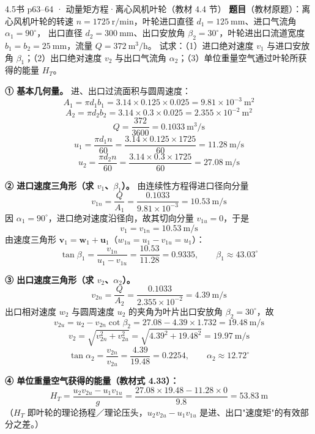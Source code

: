 \begin{liti}{4.5}{书 p63--64 · 动量矩方程·离心风机叶轮（教材 4.4 节）}
\textbf{题目}（教材原题）：离心风机叶轮的转速 $n=1725\ \mathrm{r/min}$，叶轮进口直径 $d_1=125\ \mathrm{mm}$、进口气流角 $\alpha_1=90^{\circ}$，
出口直径 $d_2=300\ \mathrm{mm}$、出口安放角 $\beta_2=30^{\circ}$，叶轮进出口流道宽度 $b_1=b_2=25\ \mathrm{mm}$，流量 $Q=372\ \mathrm{m^3/h}$。
试求：（1）进口绝对速度 $v_1$ 与进口安放角 $\beta_1$；（2）出口绝对速度 $v_2$ 与出口气流角 $\alpha_2$；（3）单位重量空气通过叶轮所获得的能量 $H_T$。


\begin{jie}
\textbf{① 基本几何量。} 进、出口过流面积与圆周速度：
\[ A_1=\pi d_1b_1=3.14\times0.125\times0.025=9.81\times10^{-3}\ \mathrm{m^2} \]
\[ A_2=\pi d_2b_2=3.14\times0.3\times0.025=2.355\times10^{-2}\ \mathrm{m^2} \]
\[ Q=\frac{372}{3600}=0.1033\ \mathrm{m^3/s} \]
\[ u_1=\frac{\pi d_1n}{60}=\frac{3.14\times0.125\times1725}{60}=11.28\ \mathrm{m/s} \]
\[ u_2=\frac{\pi d_2n}{60}=\frac{3.14\times0.3\times1725}{60}=27.08\ \mathrm{m/s} \]

\textbf{② 进口速度三角形（求 $v_1$、$\beta_1$）。} 由连续性方程得进口径向分量
\[ v_{1n}=\frac{Q}{A_1}=\frac{0.1033}{9.81\times10^{-3}}=10.53\ \mathrm{m/s} \]
因 $\alpha_1=90^{\circ}$，进口绝对速度沿径向，故其切向分量 $v_{1u}=0$，于是
\[ v_1=v_{1n}=10.53\ \mathrm{m/s} \]
由速度三角形 $\bm{v}_1=\bm{w}_1+\bm{u}_1$（$w_{1u}=u_1-v_{1u}=u_1$）：
\[ \tan\beta_1=\frac{v_{1n}}{u_1-v_{1u}}=\frac{10.53}{11.28}=0.9335,\qquad \beta_1\approx43.03^{\circ} \]

\textbf{③ 出口速度三角形（求 $v_2$、$\alpha_2$）。}
\[ v_{2n}=\frac{Q}{A_2}=\frac{0.1033}{2.355\times10^{-2}}=4.39\ \mathrm{m/s} \]
出口相对速度 $w_2$ 与圆周速度 $u_2$ 的夹角为叶片出口安放角 $\beta_2=30^{\circ}$，故
\[ v_{2u}=u_2-v_{2n}\cot\beta_2=27.08-4.39\times1.732=19.48\ \mathrm{m/s} \]
\[ v_2=\sqrt{v_{2n}^2+v_{2u}^2}=\sqrt{4.39^2+19.48^2}=19.97\ \mathrm{m/s} \]
\[ \tan\alpha_2=\frac{v_{2n}}{v_{2u}}=\frac{4.39}{19.48}=0.2254,\qquad \alpha_2\approx12.72^{\circ} \]

\textbf{④ 单位重量空气获得的能量（教材式 4.33）：}
\[ H_T=\frac{u_2v_{2u}-u_1v_{1u}}{g}=\frac{27.08\times19.48-11.28\times0}{9.8}=53.83\ \mathrm{m} \]
（$H_T$ 即叶轮的理论扬程／理论压头，$u_2v_{2u}-u_1v_{1u}$ 是进、出口"速度矩"的有效部分之差。）
\end{jie}
\end{liti}

